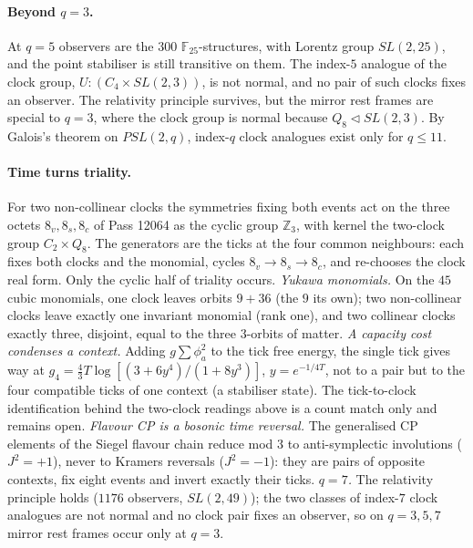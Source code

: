 \paragraph{Beyond $q=3$.}
At $q=5$ observers are the $300$ $\mathbb F_{25}$-structures, with Lorentz group $SL(2,25)$, and the point stabiliser is still transitive on them. The index-$5$ analogue of the clock group, $U{:}(C_4\times SL(2,3))$, is not normal, and no pair of such clocks fixes an observer. The relativity principle survives, but the mirror rest frames are special to $q=3$, where the clock group is normal because $Q_8\triangleleft SL(2,3)$. By Galois's theorem on $PSL(2,q)$, index-$q$ clock analogues exist only for $q\le 11$. 

\paragraph{Time turns triality.}
For two non-collinear clocks the symmetries fixing both events act on the three octets $8_v,8_s,8_c$ of
Pass 12064 as the cyclic group $\mathbb Z_3$, with kernel the two-clock group $C_2\times Q_8$. The generators are
the ticks at the four common neighbours: each fixes both clocks and the monomial, cycles
$8_v\to8_s\to8_c$, and re-chooses the clock real form. Only the cyclic half of triality occurs. 
\emph{Yukawa monomials.} On the $45$ cubic monomials, one clock leaves orbits $9+36$ (the $9$ its own); two
non-collinear clocks leave exactly one invariant monomial (rank one), and two collinear clocks exactly three,
disjoint, equal to the three $3$-orbits of matter. 
\emph{A capacity cost condenses a context.} Adding $g\sum\phi_a^2$ to the tick free energy, the single tick gives way at
$g_4=\tfrac43T\log[(3+6y^4)/(1+8y^3)]$, $y=e^{-1/4T}$, not to a pair but to the four compatible ticks of one
context (a stabiliser state). The tick-to-clock identification behind the two-clock readings above is a count
match only and remains open. 
\emph{Flavour CP is a bosonic time reversal.} The generalised CP elements of the Siegel flavour chain reduce mod $3$
to anti-symplectic involutions ($J^2=+1$), never to Kramers reversals ($J^2=-1$): they are pairs of opposite contexts,
fix eight events and invert exactly their ticks. 
\emph{$q=7$.} The relativity principle holds ($1176$ observers, $SL(2,49)$); the two classes of index-$7$ clock
analogues are not normal and no clock pair fixes an observer, so on $q=3,5,7$ mirror rest frames occur only at $q=3$. 


